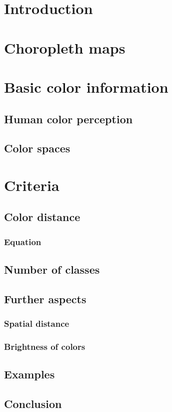 \section{Introduction}


\section{Choropleth maps}

\section{Basic color information}

\subsection{Human color perception}

\subsection{Color spaces}

\section{Criteria}

\subsection{Color distance}

\subsubsection{Equation}

\subsection{Number of classes}

\subsection{Further aspects}

\subsubsection{Spatial distance}

\subsubsection{Brightness of colors}

\subsection{Examples}

\subsection{Conclusion}


